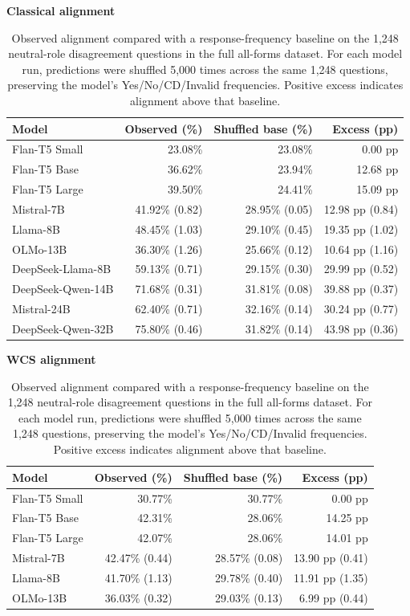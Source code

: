 \begin{table}[htbp]
\centering
\scriptsize
\setlength{\tabcolsep}{3pt}
\caption{Observed alignment compared with a response-frequency baseline on the 1,248 neutral-role disagreement questions in the full all-forms dataset. For each model run, predictions were shuffled 5,000 times across the same 1,248 questions, preserving the model's Yes/No/CD/Invalid frequencies. Positive excess indicates alignment above that baseline.}
\label{tab:response-bias-alignment-final2}
\textbf{Classical alignment}
\begin{tabular}{lrrr}
\toprule
Model & Observed (\%) & Shuffled base (\%) & Excess (pp) \\
\midrule
Flan-T5 Small & 23.08\% & 23.08\% & 0.00 pp \\
Flan-T5 Base & 36.62\% & 23.94\% & 12.68 pp \\
Flan-T5 Large & 39.50\% & 24.41\% & 15.09 pp \\
Mistral-7B & 41.92\% (0.82) & 28.95\% (0.05) & 12.98 pp (0.84) \\
Llama-8B & 48.45\% (1.03) & 29.10\% (0.45) & 19.35 pp (1.02) \\
OLMo-13B & 36.30\% (1.26) & 25.66\% (0.12) & 10.64 pp (1.16) \\
DeepSeek-Llama-8B & 59.13\% (0.71) & 29.15\% (0.30) & 29.99 pp (0.52) \\
DeepSeek-Qwen-14B & 71.68\% (0.31) & 31.81\% (0.08) & 39.88 pp (0.37) \\
Mistral-24B & 62.40\% (0.71) & 32.16\% (0.14) & 30.24 pp (0.77) \\
DeepSeek-Qwen-32B & 75.80\% (0.46) & 31.82\% (0.14) & 43.98 pp (0.36) \\
\bottomrule
\end{tabular}
\vspace{4pt}
\textbf{WCS alignment}
\begin{tabular}{lrrr}
\toprule
Model & Observed (\%) & Shuffled base (\%) & Excess (pp) \\
\midrule
Flan-T5 Small & 30.77\% & 30.77\% & 0.00 pp \\
Flan-T5 Base & 42.31\% & 28.06\% & 14.25 pp \\
Flan-T5 Large & 42.07\% & 28.06\% & 14.01 pp \\
Mistral-7B & 42.47\% (0.44) & 28.57\% (0.08) & 13.90 pp (0.41) \\
Llama-8B & 41.70\% (1.13) & 29.78\% (0.40) & 11.91 pp (1.35) \\
OLMo-13B & 36.03\% (0.32) & 29.03\% (0.13) & 6.99 pp (0.44) \\

\end{tabular}
\end{table}
